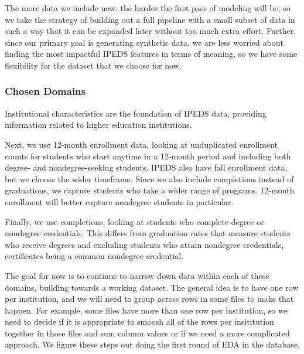 \documentclass[sigconf, authorversion, nonacm]{acmart}
\begin{document}
        The more data we include now, the harder the first pass of modeling will be, so we take the strategy of building out a full pipeline with a small subset of data in such a way that it can be expanded later without too much extra effort. Further, since our primary goal is generating synthetic data, we are less worried about finding the most impactful IPEDS features in terms of meaning, so we have some flexibility for the dataset that we choose for now.

        \subsubsection{Chosen Domains}

            Institutional characteristics are the foundation of IPEDS data, providing information related to higher education institutions.

            Next, we use 12-month enrollment data, looking at unduplicated enrollment counts for students who start anytime in a 12-month period and including both degree- and nondegree-seeking students. IPEDS also have fall enrollment data, but we choose the wider timeframe. Since we also include completions instead of graduations, we capture students who take a wider range of programs. 12-month enrollment will better capture nondegree students in particular.

            Finally, we use completions, looking at students who complete degree or nondegree credentials. This differs from graduation rates that measure students who receive degrees and excluding students who attain nondegree credentials, certificates being a common nondegree credential.





            The goal for now is to continue to narrow down data within each of these domains, building towards a working dataset. The general idea is to have one row per institution, and we will need to group across rows in some files to make that happen. For example, some files have more than one row per institution, so we need to decide if it is appropriate to smoosh all of the rows per insititution together in those files and sum column values or if we need a more complicated approach. We figure these steps out doing the first round of EDA in the database.
\end{document}
